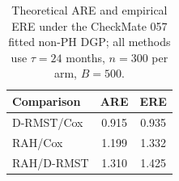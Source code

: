 \begin{table}[ht]
\centering
\caption{Theoretical ARE and empirical ERE under the CheckMate 057 fitted non-PH DGP; all methods use $\tau=24$ months, $n=300$ per arm, $B=500$.}
\label{tab:cm057-are-ere}
\begin{tabular}{lcc}
\toprule
Comparison & ARE & ERE
\\
\midrule
D-RMST/Cox & 0.915 & 0.935 \\
RAH/Cox & 1.199 & 1.332 \\
RAH/D-RMST & 1.310 & 1.425 \\
\bottomrule
\end{tabular}
\end{table}
